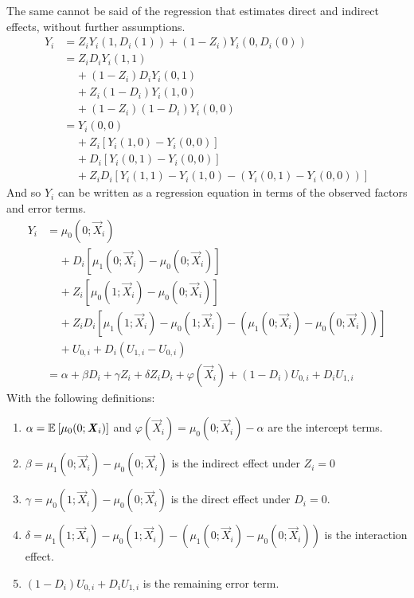 The same cannot be said of the regression that estimates direct and indirect effects, without further assumptions.
\begin{align*}
    Y_i &= Z_i Y_i(1, D_i(1)) + (1 - Z_i) Y_i(0, D_i(0)) \\
        &= Z_i D_i Y_i(1, 1) \\
        & \;\;\;\; + (1 - Z_i) D_i Y_i(0, 1) \\
        & \;\;\;\; + Z_i (1 - D_i) Y_i(1, 0) \\
        & \;\;\;\; + (1 - Z_i) (1 - D_i) Y_i(0, 0) \\
        &= Y_i(0, 0) \\
        & \;\;\;\; + Z_i \left[Y_i(1, 0) - Y_i(0, 0) \right] \\
        & \;\;\;\; + D_i \left[Y_i(0, 1) - Y_i(0, 0) \right] \\
        & \;\;\;\; + Z_i D_i \left[Y_i(1, 1) - Y_i(1, 0)
            - \left( Y_i(0, 1) - Y_i(0, 0) \right)\right]
\end{align*}
And so $Y_i$ can be written as a regression equation in terms of the observed factors and error terms.
\begin{align*}
    Y_i &= \mu_0(0; \vec X_i) \\
        & \;\;\;\; + D_i \left[\mu_1(0; \vec X_i) - \mu_0(0; \vec X_i) \right] \\
        & \;\;\;\; + Z_i \left[\mu_0(1; \vec X_i) - \mu_0(0; \vec X_i) \right] \\
        & \;\;\;\; + Z_i D_i \left[\mu_1(1; \vec X_i) - \mu_0(1; \vec X_i)
            - \left( \mu_1(0; \vec X_i) - \mu_0(0; \vec X_i) \right)\right] \\
        & \;\;\;\; + U_{0,i} + D_i \left( U_{1,i} - U_{0,i} \right) \\
        &=
            \alpha + \beta D_i + \gamma Z_i + \delta Z_i D_i
            + \varphi(\vec X_i)
            + \left( 1 - D_i \right) U_{0,i} + D_i U_{1,i}
\end{align*}
With the following definitions:
\begin{enumerate}[label=\textbf{(\alph*)}]
    \item $\alpha = \mathbb{E}_{} \left[ \mu_0(0; \boldsymbol{\mathit{X}}_i) \right]$ and $\varphi(\vec X_i) = \mu_0(0; \vec X_i) - \alpha$ are the intercept terms.
    \item $\beta = \mu_1(0; \vec X_i) - \mu_0(0; \vec X_i)$ is the indirect effect under $Z_i = 0$
    \item $\gamma = \mu_0(1; \vec X_i) - \mu_0(0; \vec X_i)$ is the direct effect under $D_i = 0$.
    \item $\delta = \mu_1(1; \vec X_i) - \mu_0(1; \vec X_i)- \left( \mu_1(0; \vec X_i) - \mu_0(0; \vec X_i) \right)$ is the interaction effect.
    \item $\left( 1 - D_i \right) U_{0,i} + D_i U_{1,i}$ is the remaining error term.
\end{enumerate}
